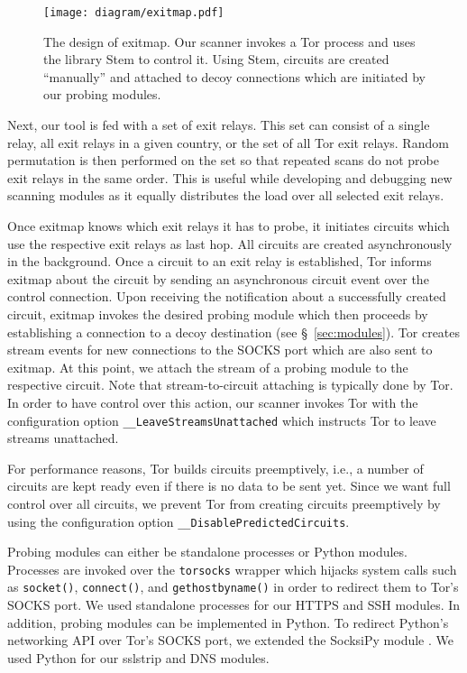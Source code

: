 \documentclass[letterpaper,twocolumn,10pt]{article}
\begin{document}
\begin{figure}[t]
	\centering
	\texttt{[image: diagram/exitmap.pdf]}
	\caption{The design of \textsf{exitmap}.  Our scanner invokes a Tor process and uses the library
	\textsf{Stem} to control it.  Using \textsf{Stem}, circuits are created ``manually'' and
	attached to decoy connections which are initiated by our probing modules.}
	\label{fig:scanner}
\end{figure}

Next, our tool is fed with a set of exit relays.  This set can consist of a single relay, all exit
relays in a given country, or the set of all Tor exit relays.  Random permutation is then performed
on the set so that repeated scans do not probe exit relays in the same order.  This is useful
while developing and debugging new scanning modules as it equally distributes the load over all
selected exit relays.

Once \textsf{exitmap} knows which exit relays it has to probe, it initiates circuits which use the
respective exit relays as last hop.  All circuits are created asynchronously in the background.
Once a circuit to an exit relay is established, Tor informs \textsf{exitmap} about the circuit by
sending an asynchronous circuit event over the control connection.  Upon receiving the notification
about a successfully created circuit, \textsf{exitmap} invokes the desired probing module which then
proceeds by establishing a connection to a decoy destination (see \S~\ref{sec:modules}).  Tor
creates stream events for new connections to the SOCKS port which are also sent to \textsf{exitmap}.
At this point, we attach the stream of a probing module to the respective circuit.  Note that
stream-to-circuit attaching is typically done by Tor.  In order to have control over this action,
our scanner invokes Tor with the configuration option \texttt{\_\_LeaveStreamsUnattached} which
instructs Tor to leave streams unattached.

For performance reasons, Tor builds circuits preemptively, i.e., a number of circuits are kept ready
even if there is no data to be sent yet.  Since we want full control over all circuits, we prevent
Tor from creating circuits preemptively by using the configuration option
\texttt{\_\_DisablePredictedCircuits}.

Probing modules can either be standalone processes or Python modules.  Processes are invoked over
the \texttt{torsocks} wrapper \cite{torsocks} which hijacks system calls such as \texttt{socket()},
\texttt{connect()}, and \texttt{gethostbyname()} in order to redirect them to Tor's SOCKS port.  We
used standalone processes for our HTTPS and SSH modules.  In addition, probing modules can be
implemented in Python.  To redirect Python's networking API over Tor's SOCKS port, we extended the
SocksiPy module \cite{socksipy}.  We used Python for our sslstrip and DNS modules.
\end{document}
